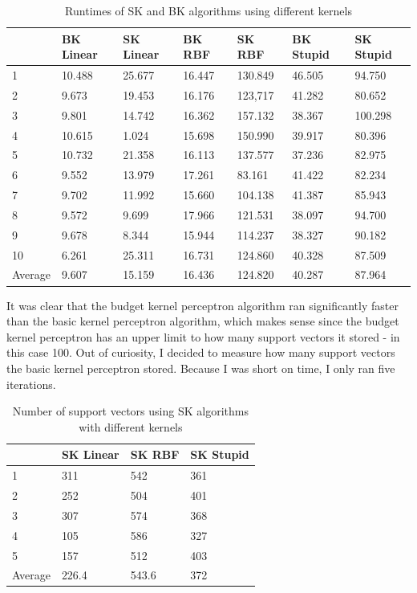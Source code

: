 \documentclass[submit]{harvardml}
\begin{document}
\begin{table}[htb]
\centering
\caption{Runtimes of SK and BK algorithms using different kernels}
\label{my-label}
\begin{tabular}{l|llllll}
        & BK Linear & SK Linear & BK RBF & SK RBF  & BK Stupid & SK Stupid \\ \hline
1       & 10.488    & 25.677    & 16.447 & 130.849 & 46.505    & 94.750    \\
2       & 9.673     & 19.453    & 16.176 & 123,717 & 41.282    & 80.652    \\
3       & 9.801     & 14.742    & 16.362 & 157.132 & 38.367    & 100.298   \\
4       & 10.615    & 1.024     & 15.698 & 150.990 & 39.917    & 80.396    \\
5       & 10.732    & 21.358    & 16.113 & 137.577 & 37.236    & 82.975    \\
6       & 9.552     & 13.979    & 17.261 & 83.161  & 41.422    & 82.234    \\
7       & 9.702     & 11.992    & 15.660 & 104.138 & 41.387    & 85.943    \\
8       & 9.572     & 9.699     & 17.966 & 121.531 & 38.097    & 94.700    \\
9       & 9.678     & 8.344     & 15.944 & 114.237 & 38.327    & 90.182    \\
10      & 6.261     & 25.311    & 16.731 & 124.860 & 40.328    & 87.509    \\ \hline
Average & 9.607     & 15.159    & 16.436 & 124.820 & 40.287    & 87.964   
\end{tabular}
\end{table}
\noindent It was clear that the budget kernel perceptron algorithm ran significantly faster than the basic kernel perceptron algorithm, which makes sense since the budget kernel perceptron has an upper limit to how many support vectors it stored - in this case 100. Out of curiosity, I decided to measure how many support vectors the basic kernel perceptron stored. Because I was short on time, I only ran five iterations. 
\begin{table}[hbt]
\centering
\caption{Number of support vectors using SK algorithms with different kernels}
\label{my-label}
\begin{tabular}{l|lll}
        & SK Linear & SK RBF & SK Stupid \\ \hline
1       & 311       & 542    & 361       \\
2       & 252       & 504    & 401       \\
3       & 307       & 574    & 368       \\
4       & 105       & 586    & 327       \\
5       & 157       & 512    & 403       \\ \hline
Average & 226.4     & 543.6  & 372      
\end{tabular}
\end{table}
\end{document}
